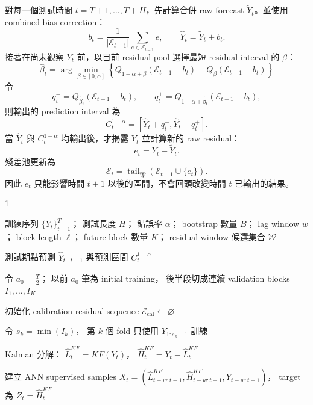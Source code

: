 {對每一個測試時間 $t=T+1,\ldots,T+H$，先計算合併 raw forecast $\widetilde Y_t$。並使用 combined bias correction：
\[
    b_t=\frac{1}{|\mathcal E_{t-1}|}
    \sum_{e\in\mathcal E_{t-1}}e,
    \qquad
    \widehat Y_t=\widetilde Y_t+b_t.
\]
接著在尚未觀察 $Y_t$ 前，以目前 residual pool 選擇最短 residual interval 的 $\beta$：
\[
\widehat\beta_t
=\arg\min_{\beta\in[0,\alpha]}
\left\{
Q_{1-\alpha+\beta}(\mathcal E_{t-1}-b_t)
-Q_{\beta}(\mathcal E_{t-1}-b_t)
\right\}
\]
令
\[
q_t^-=Q_{\widehat\beta_t}(\mathcal E_{t-1}-b_t),
\qquad
q_t^+=Q_{1-\alpha+\widehat\beta_t}(\mathcal E_{t-1}-b_t),
\]
則輸出的 prediction interval 為
\[
    C_t^{1-\alpha}
    =[\widehat Y_t+q_t^-,\widehat Y_t+q_t^+].
\]
當 $\widehat Y_t$ 與 $C_t^{1-\alpha}$ 均輸出後，才揭露 $Y_t$ 並計算新的 raw residual：
\[
    e_t=Y_t-\widetilde Y_t.
\]
殘差池更新為
\[
    \mathcal E_t
    =\operatorname{tail}_{\widehat W}
    \left(\mathcal E_{t-1}\cup\{e_t\}\right).
\]
因此 $e_t$ 只能影響時間 $t+1$ 以後的區間，不會回頭改變時間 $t$ 已輸出的結果。

\begin{algorithm}[htbp]
\caption{Kalman--ARIMA--ANN Out-of-Time Adaptive EnbPI}
\label{alg:kf-oot-enbpi}

\begin{spacing}{1}

\begin{algorithmic}[1]

\Require
訓練序列 $\{Y_t\}_{t=1}^{T}$；
測試長度 $H$；
錯誤率 $\alpha$；
bootstrap 數量 $B$；
lag window $w$；
block length $\ell$；
future-block 數量 $K$；
residual-window 候選集合 $\mathcal W$

\Ensure
測試期點預測 $\widehat Y_{t\mid t-1}$
與預測區間 $C_t^{1-\alpha}$

\State
令 $a_0=\frac{T}{2}$；
以前 $a_0$ 筆為 initial training，
後半段切成連續 validation blocks $I_1,\ldots,I_K$

\State
初始化 calibration residual sequence $\mathcal E_{\mathrm{cal}}\gets\varnothing$


    \State
    令 $s_k=\min(I_k)$，
    第 $k$ 個 fold 只使用 $Y_{1:s_k-1}$ 訓練

    \State
    Kalman 分解：
    $\widehat L_t^{KF}=KF(Y_t)$，
    $\widehat H_t^{KF}=Y_t-\widehat L_t^{KF}$

    \State
    建立 ANN supervised samples 
    $X_t=(\widehat L_{t-w:t-1}^{KF},
    \widehat H_{t-w:t-1}^{KF},Y_{t-w:t-1})$，
    target 為 $Z_t=\widehat H_t^{KF}$


\end{algorithmic}
\end{spacing}
\end{algorithm}}
